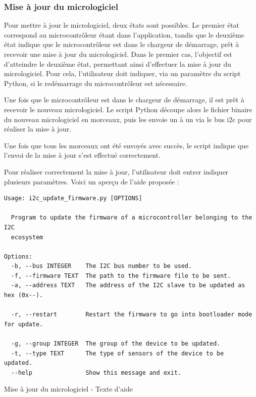\subsubsection{Mise à jour du micrologiciel}

Pour mettre à jour le micrologiciel, deux états sont possibles.
Le premier état correspond au microcontrôleur étant dans l'application, tandis que le deuxième état indique que le microcontrôleur est dans le chargeur de démarrage, prêt à recevoir une mise à jour du micrologiciel.
Dans le premier cas, l'objectif est d'atteindre le deuxième état, permettant ainsi d'effectuer la mise à jour du micrologiciel.
Pour cela, l'utilisateur doit indiquer, via un paramètre du script Python, si le redémarrage du microcontrôleur est nécessaire.

Une fois que le microcontrôleur est dans le chargeur de démarrage, il est prêt à recevoir le nouveau micrologiciel.
Le script Python découpe alors le fichier binaire du nouveau micrologiciel en morceaux, puis les envoie un à un via le bus \gls{i2c} pour réaliser la mise à jour.

Une fois que tous les morceaux ont été envoyés avec succès, le script indique que l'envoi de la mise à jour s'est effectué correctement.

Pour réaliser correctement la mise à jour, l'utilisateur doit entrer indiquer plusieurs paramètres. Voici un aperçu de l'aide proposée :

\begin{listing}[!h]
    \begin{lstlisting}
Usage: i2c_update_firmware.py [OPTIONS]

  Program to update the firmware of a microcontroller belonging to the I2C
  ecosystem

Options:
  -b, --bus INTEGER    The I2C bus number to be used.
  -f, --firmware TEXT  The path to the firmware file to be sent.
  -a, --address TEXT   The address of the I2C slave to be updated as hex (0x--).

  -r, --restart        Restart the firmware to go into bootloader mode for update.

  -g, --group INTEGER  The group of the device to be updated.
  -t, --type TEXT      The type of sensors of the device to be updated.
  --help               Show this message and exit.
    \end{lstlisting}
    \caption{Mise à jour du micrologiciel - Texte d'aide}
\end{listing}

